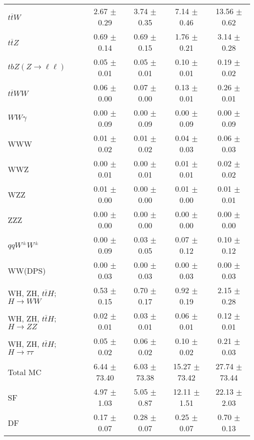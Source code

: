 \begin{tabular}{l|cccc}
                   $t\overline{t}W$ &  2.67 $\pm$  0.29 &  3.74 $\pm$  0.35 &  7.14 $\pm$  0.46 & 13.56 $\pm$  0.62 \\
                   $t\overline{t}Z$ &  0.69 $\pm$  0.14 &  0.69 $\pm$  0.15 &  1.76 $\pm$  0.21 &  3.14 $\pm$  0.28 \\
    $tbZ (Z \rightarrow \ell \ell)$ &  0.05 $\pm$  0.01 &  0.05 $\pm$  0.01 &  0.10 $\pm$  0.01 &  0.19 $\pm$  0.02 \\
                  $t\overline{t}WW$ &  0.06 $\pm$  0.00 &  0.07 $\pm$  0.00 &  0.13 $\pm$  0.01 &  0.26 $\pm$  0.01 \\
                         $WW\gamma$ &  0.00 $\pm$  0.09 &  0.00 $\pm$  0.09 &  0.00 $\pm$  0.09 &  0.00 $\pm$  0.09 \\
                                WWW &  0.01 $\pm$  0.02 &  0.01 $\pm$  0.02 &  0.04 $\pm$  0.03 &  0.06 $\pm$  0.03 \\
                                WWZ &  0.00 $\pm$  0.01 &  0.00 $\pm$  0.01 &  0.01 $\pm$  0.01 &  0.02 $\pm$  0.02 \\
                                WZZ &  0.01 $\pm$  0.00 &  0.00 $\pm$  0.00 &  0.01 $\pm$  0.00 &  0.01 $\pm$  0.01 \\
                                ZZZ &  0.00 $\pm$  0.00 &  0.00 $\pm$  0.00 &  0.00 $\pm$  0.00 &  0.00 $\pm$  0.00 \\
                 $qqW^{\pm}W^{\pm}$ &  0.00 $\pm$  0.09 &  0.03 $\pm$  0.05 &  0.07 $\pm$  0.12 &  0.10 $\pm$  0.12 \\
                            WW(DPS) &  0.00 $\pm$  0.03 &  0.00 $\pm$  0.03 &  0.00 $\pm$  0.03 &  0.00 $\pm$  0.03 \\
WH, ZH, $t\bar{t}H$; $H \rightarrow WW$ &  0.53 $\pm$  0.15 &  0.70 $\pm$  0.17 &  0.92 $\pm$  0.19 &  2.15 $\pm$  0.28 \\
WH, ZH, $t\bar{t}H$; $H \rightarrow ZZ$ &  0.02 $\pm$  0.01 &  0.03 $\pm$  0.01 &  0.06 $\pm$  0.01 &  0.12 $\pm$  0.01 \\
WH, ZH, $t\bar{t}H$; $H \rightarrow \tau\tau$ &  0.05 $\pm$  0.02 &  0.06 $\pm$  0.02 &  0.10 $\pm$  0.02 &  0.21 $\pm$  0.03 \\
\hline\hline
                           Total MC &  6.44 $\pm$ 73.40 &  6.03 $\pm$ 73.38 & 15.27 $\pm$ 73.42 & 27.74 $\pm$ 73.44 \\
\hline
                                 SF &  4.97 $\pm$  1.03 &  5.05 $\pm$  0.87 & 12.11 $\pm$  1.51 & 22.13 $\pm$  2.03 \\
                                 DF &  0.17 $\pm$  0.07 &  0.28 $\pm$  0.07 &  0.25 $\pm$  0.07 &  0.70 $\pm$  0.13 \\

\end{tabular}
